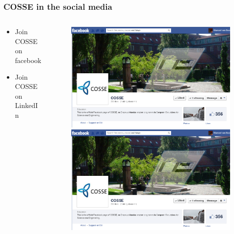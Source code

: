 \documentclass{beamer}
\begin{document}
\begin{frame}
\frametitle{COSSE in the social media}
\begin{columns}
\begin{column}{0.55\textwidth}
\begin{itemize}
 \item Join COSSE on facebook
 \item Join COSSE on LinkedIn
\end{itemize}
\end{column}
\begin{column}{0.45\textwidth}
\begin{figure}
\centering
\includegraphics[width=\textwidth]{images/fb.png}\\
\vspace{0.3cm}
\includegraphics[width=\textwidth]{images/fb.png}
\end{figure}
\end{column}
\end{columns}

\end{frame}
\end{document}
